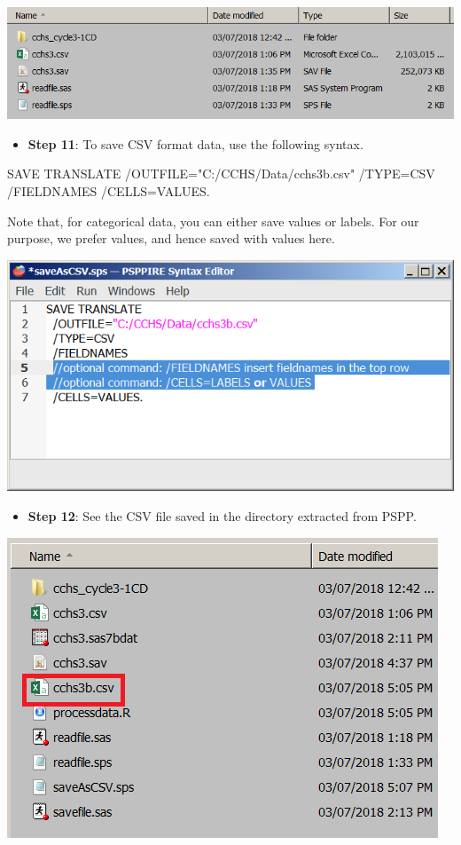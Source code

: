 \documentclass[
]{book}
\newenvironment{Shaded}{\begin{snugshade}}{\end{snugshade}}
\newcommand{\NormalTok}[1]{#1}
\newcommand{\OtherTok}[1]{\textcolor[rgb]{0.56,0.35,0.01}{#1}}
\newcommand{\SpecialCharTok}[1]{\textcolor[rgb]{0.00,0.00,0.00}{#1}}
\newcommand{\StringTok}[1]{\textcolor[rgb]{0.31,0.60,0.02}{#1}}
\providecommand{\tightlist}{%
  \setlength{\itemsep}{0pt}\setlength{\parskip}{0pt}}
\begin{document}
\includegraphics[width=0.65\linewidth]{images/abacus40}

\begin{itemize}
\tightlist
\item
  \textbf{Step 11}: To save CSV format data, use the following syntax.
\end{itemize}

\begin{Shaded}
\begin{Highlighting}[]
\NormalTok{SAVE TRANSLATE}
  \SpecialCharTok{/}\NormalTok{OUTFILE}\OtherTok{=}\StringTok{"C:/CCHS/Data/cchs3b.csv"}  
  \SpecialCharTok{/}\NormalTok{TYPE}\OtherTok{=}\NormalTok{CSV}
  \SpecialCharTok{/}\NormalTok{FIELDNAMES      }
  \SpecialCharTok{/}\NormalTok{CELLS}\OtherTok{=}\NormalTok{VALUES.}
\end{Highlighting}
\end{Shaded}

Note that, for categorical data, you can either save values or labels. For our purpose, we prefer values, and hence saved with values here.

\includegraphics[width=0.65\linewidth]{images/abacus41}

\begin{itemize}
\tightlist
\item
  \textbf{Step 12}: See the CSV file saved in the directory extracted from PSPP.
\end{itemize}

\includegraphics[width=0.65\linewidth]{images/abacus42}
\end{document}
